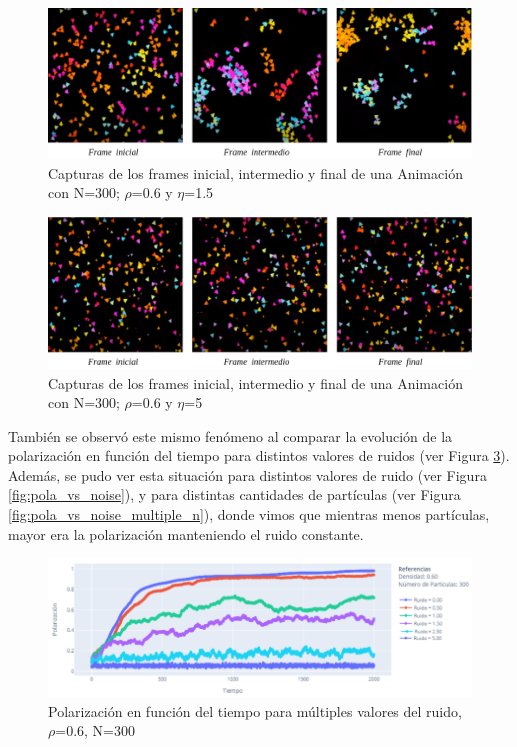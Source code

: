 \documentclass[12pt, a4paper]{report}
\begin{document}
\begin{figure}[h]
\includegraphics[scale=0.4]{noise_N300_d06_n1_5.png}
\centering 
\caption{Capturas de los frames inicial, intermedio y final de una Animación con N=300; $\rho$=0.6 y $\eta$=1.5}
\label{fig:noise_N300_d06_n1_5}
\end{figure}

\pagebreak
\begin{figure}[h]
\includegraphics[scale=0.4]{noise_N300_d06_n5.png}
\centering 
\caption{Capturas de los frames inicial, intermedio y final de una Animación con N=300; $\rho$=0.6 y $\eta$=5}
\label{fig:noise_N300_d06_n5}
\end{figure}

También se observó este mismo fenómeno al comparar la evolución de la polarización en función del tiempo para distintos valores de ruidos (ver Figura \ref{fig:noise_pola_vs_time_multiple_n}). \\

Además, se pudo ver esta situación para distintos valores de ruido (ver Figura \ref{fig:pola_vs_noise}), y para distintas cantidades de partículas (ver Figura \ref{fig:pola_vs_noise_multiple_n}), donde vimos que mientras menos partículas, mayor era la polarización manteniendo el ruido constante.

\pagebreak
\begin{figure}[h]
\includegraphics[scale=0.45]{noise_pola_vs_time_multiple_n.png}
\centering 
\caption{Polarización en función del tiempo para múltiples valores del ruido, $\rho$=0.6, N=300 }
\label{fig:noise_pola_vs_time_multiple_n}
\end{figure}
\end{document}
